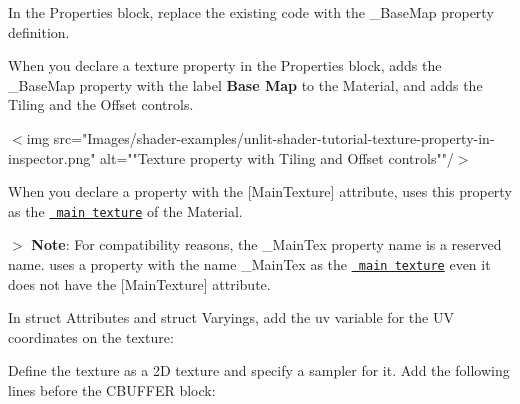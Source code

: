 \begin{DoxyEnumerate}
\item In the Properties block, replace the existing code with the {\ttfamily \+\_\+\+Base\+Map} property definition.


\begin{DoxyCode}{0}
\DoxyCodeLine{++}
\DoxyCodeLine{\ \ \ \{}
\DoxyCodeLine{\ \ \ \}}

\end{DoxyCode}


When you declare a texture property in the Properties block,  adds the {\ttfamily \+\_\+\+Base\+Map} property with the label {\bfseries{Base Map}} to the Material, and adds the Tiling and the Offset controls.

\texorpdfstring{$<$}{<}img src="{}\+Images/shader-\/examples/unlit-\/shader-\/tutorial-\/texture-\/property-\/in-\/inspector.\+png"{} alt="{}"{}Texture property with Tiling and Offset controls"{}"{}/\texorpdfstring{$>$}{>}

When you declare a property with the {\ttfamily \mbox{[}Main\+Texture\mbox{]}} attribute,  uses this property as the \href{https://docs.unity3d.com/ScriptReference/Material-mainTexture.html}{\texttt{ main texture}} of the Material.

\texorpdfstring{$>$}{>} {\bfseries{Note}}\+: For compatibility reasons, the {\ttfamily \+\_\+\+Main\+Tex} property name is a reserved name.  uses a property with the name {\ttfamily \+\_\+\+Main\+Tex} as the \href{https://docs.unity3d.com/ScriptReference/Material-mainTexture.html}{\texttt{ main texture}} even it does not have the {\ttfamily \mbox{[}Main\+Texture\mbox{]}} attribute.
\item In {\ttfamily struct Attributes} and {\ttfamily struct Varyings}, add the {\ttfamily uv} variable for the UV coordinates on the texture\+:


\begin{DoxyCode}{0}
\DoxyCodeLine{++}

\end{DoxyCode}

\item Define the texture as a 2D texture and specify a sampler for it. Add the following lines before the CBUFFER block\+:



\end{DoxyEnumerate}
